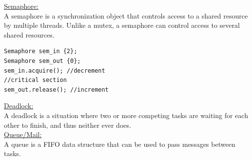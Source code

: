 \underline{Semaphore:}\\
A semaphore is a synchronization object that controls access to a shared resource by multiple
threads. Unlike a mutex, a semaphore can control access to several shared resources.
\begin{verbatim}
Semaphore sem_in {2};
Semaphore sem_out {0};
sem_in.acquire(); //decrement
//critical section
sem_out.release(); //increment
\end{verbatim}
\underline{Deadlock:}\\
A deadlock is a situation where two or more competing tasks are waiting for each other to
finish, and thus neither ever does.\\
\underline{Queue/Mail:}\\
A queue is a FIFO data structure that can be used to pass messages between tasks.\\